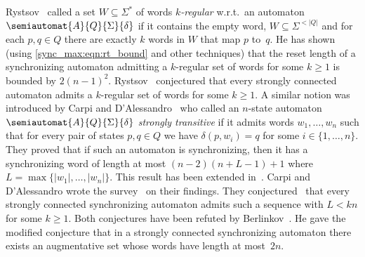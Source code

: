 Rystsov~\cite{Rystsov95a,Rystsov1995a} called a set $W \subseteq \Sigma^*$
of words \emph{$k$-regular} w.r.t.~an automaton $\semiautomat{A}{Q}{\Sigma}{\delta}$  
if it contains the empty word, $W \subseteq \Sigma^{< |Q|}$
and for each $p, q \in Q$ there are exactly $k$ words in $W$
that map $p$ to~$q$. He has shown (using \cref{sync_max:eqn:rt_bound} and other techniques)
that the reset length of a synchronizing automaton admitting a $k$-regular set of words 
for some $k \ge 1$ is bounded by $2(n-1)^2$.
Rystsov~\cite{Rystsov95a,Rystsov1995a} conjectured that every 
strongly connected automaton admits a $k$-regular set of words for some $k \ge 1$.
A similar notion was introduced by Carpi and D'Alessandro~\cite{DBLP:journals/acta/CarpiD09} 
who called an $n$-state automaton $\semiautomat{A}{Q}{\Sigma}{\delta}$ \emph{strongly transitive}
if it admits words $w_1, \ldots, w_n$ such that for every pair of states $p,q \in Q$
we have $\delta(p, w_i) = q$ for some $i \in \{1,\ldots,n\}$. They proved
that if such an automaton is synchronizing, then it has a synchronizing word of length
at most $(n - 2)(n + L - 1) + 1$ where $L = \max\{ |w_1|, \ldots, |w_n| \}$.
This result has been extended in~\cite{DBLP:journals/tcs/CarpiD17}.
Carpi and D'Alessandro wrote the survey~\cite{DBLP:journals/jalc/CarpiD19}
on their findings. They conjectured~\cite{DBLP:journals/acta/CarpiD09}
that every strongly connected synchronizing
automaton admits such a sequence with $L < kn$ for some $k \ge 1$.
Both conjectures have been refuted by Berlinkov~\cite{DBLP:journals/ijfcs/Berlinkov11}.
He gave the modified conjecture that in a strongly connected synchronizing automaton 
there exists an augmentative set whose words have length at most~$2n$.